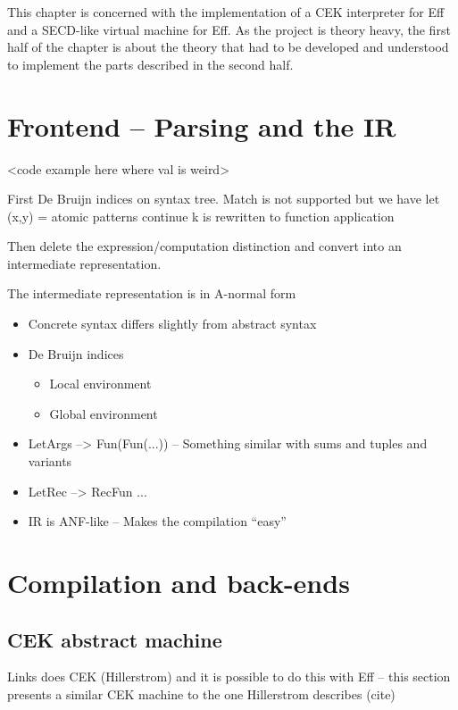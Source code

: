 \documentclass[class=article, crop=false]{standalone}
\begin{document}
This chapter is concerned with the implementation of a CEK interpreter for Eff and
a SECD-like virtual machine for Eff. As the project is theory heavy, the first
half of the chapter is about the theory that had to be developed and understood
to implement the parts described in the second half.

\section{Frontend -- Parsing and the IR}

<code example here where val is weird>

First De Bruijn indices on syntax tree.
Match is not supported but we have let (x,y) =
atomic patterns
continue k is rewritten to function application

Then delete the expression/computation distinction and convert into
an intermediate representation.

The intermediate representation is in A-normal form 



\begin{itemize}
\item Concrete syntax differs slightly from abstract syntax
\item De Bruijn indices
\begin{itemize}
    \item Local environment
    \item Global environment
\end{itemize}
\item LetArgs --> Fun(Fun(...)) -- Something similar with sums and tuples and variants
\item LetRec --> RecFun ...
\item IR is ANF-like -- Makes the compilation ``easy''
\end{itemize}

\section{Compilation and back-ends}

\subsection{CEK abstract machine}

Links does CEK (Hillerstrom) and it is possible to do this with Eff --
this section presents a similar CEK machine to the one Hillerstrom describes (cite)
\end{document}

